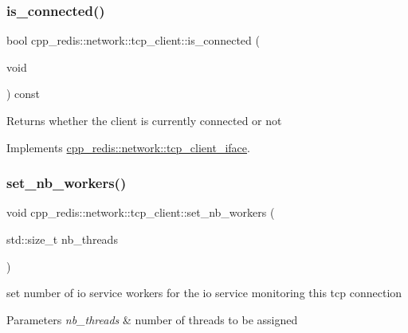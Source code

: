 \subsubsection{\texorpdfstring{is\+\_\+connected()}{is\_connected()}}
{\footnotesize\ttfamily bool cpp\+\_\+redis\+::network\+::tcp\+\_\+client\+::is\+\_\+connected (\begin{DoxyParamCaption}\item[{void}]{ }\end{DoxyParamCaption}) const\hspace{0.3cm}{\ttfamily [virtual]}}

\begin{DoxyReturn}{Returns}
whether the client is currently connected or not 
\end{DoxyReturn}


Implements \mbox{\hyperlink{classcpp__redis_1_1network_1_1tcp__client__iface_a41ad0b43e3ab172828a3d2ce55d23893}{cpp\+\_\+redis\+::network\+::tcp\+\_\+client\+\_\+iface}}.

\mbox{\label{classcpp__redis_1_1network_1_1tcp__client_aa56fc49540d67c5c05b3dda3aaff8a0f}} 
\subsubsection{\texorpdfstring{set\+\_\+nb\+\_\+workers()}{set\_nb\_workers()}}
{\footnotesize\ttfamily void cpp\+\_\+redis\+::network\+::tcp\+\_\+client\+::set\+\_\+nb\+\_\+workers (\begin{DoxyParamCaption}\item[{std\+::size\+\_\+t}]{nb\+\_\+threads }\end{DoxyParamCaption})}

set number of io service workers for the io service monitoring this tcp connection


\begin{DoxyParams}{Parameters}
{\em nb\+\_\+threads} & number of threads to be assigned \\
\hline
\end{DoxyParams}
\mbox{\label{classcpp__redis_1_1network_1_1tcp__client_a24ccdf6dc467aac13cb832a395adb38d}} 
